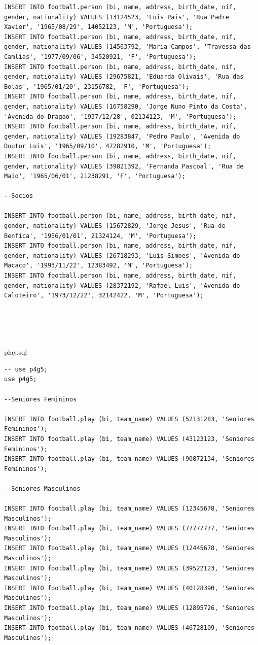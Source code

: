 \documentclass[pdftex,12pt,a4paper]{report}
\begin{document}
\begin{lstlisting}
INSERT INTO football.person (bi, name, address, birth_date, nif, gender, nationality) VALUES (13124523, 'Luis Pais', 'Rua Padre Xavier', '1965/08/29', 14052123, 'M', 'Portuguesa'); 
INSERT INTO football.person (bi, name, address, birth_date, nif, gender, nationality) VALUES (14563792, 'Maria Campos', 'Travessa das Camlias', '1977/09/06', 34520921, 'F', 'Portuguesa');
INSERT INTO football.person (bi, name, address, birth_date, nif, gender, nationality) VALUES (29675821, 'Eduarda Olivais', 'Rua das Bolas', '1965/01/20', 23156782, 'F', 'Portuguesa'); 
INSERT INTO football.person (bi, name, address, birth_date, nif, gender, nationality) VALUES (16758290, 'Jorge Nuno Pinto da Costa', 'Avenida do Dragao', '1937/12/28', 02134123, 'M', 'Portuguesa'); 
INSERT INTO football.person (bi, name, address, birth_date, nif, gender, nationality) VALUES (19283847, 'Pedro Paulo', 'Avenida do Doutor Luis', '1965/09/10', 47282910, 'M', 'Portuguesa');
INSERT INTO football.person (bi, name, address, birth_date, nif, gender, nationality) VALUES (39821392, 'Fernanda Pascoal', 'Rua de Maio', '1965/06/01', 21238291, 'F', 'Portuguesa');

--Socios

INSERT INTO football.person (bi, name, address, birth_date, nif, gender, nationality) VALUES (15672829, 'Jorge Jesus', 'Rua de Benfica', '1956/01/01', 21324124, 'M', 'Portuguesa'); 
INSERT INTO football.person (bi, name, address, birth_date, nif, gender, nationality) VALUES (26718293, 'Luis Simoes', 'Avenida do Macaco', '1993/11/22', 12383492, 'M', 'Portuguesa'); 
INSERT INTO football.person (bi, name, address, birth_date, nif, gender, nationality) VALUES (28372192, 'Rafael Luis', 'Avenida do Caloteiro', '1973/12/22', 32142422, 'M', 'Portuguesa');





\end{lstlisting}

play.sql
\begin{lstlisting} 
-- use p4g5;
use p4g5;

--Seniores Femininos

INSERT INTO football.play (bi, team_name) VALUES (52131283, 'Seniores Femininos');
INSERT INTO football.play (bi, team_name) VALUES (43123123, 'Seniores Femininos');
INSERT INTO football.play (bi, team_name) VALUES (90872134, 'Seniores Femininos');

--Seniores Masculinos

INSERT INTO football.play (bi, team_name) VALUES (12345678, 'Seniores Masculinos');
INSERT INTO football.play (bi, team_name) VALUES (77777777, 'Seniores Masculinos');
INSERT INTO football.play (bi, team_name) VALUES (12445678, 'Seniores Masculinos');
INSERT INTO football.play (bi, team_name) VALUES (39522123, 'Seniores Masculinos');
INSERT INTO football.play (bi, team_name) VALUES (40128390, 'Seniores Masculinos');
INSERT INTO football.play (bi, team_name) VALUES (12895726, 'Seniores Masculinos');
INSERT INTO football.play (bi, team_name) VALUES (46728109, 'Seniores Masculinos');
\end{lstlisting}
\end{document}
